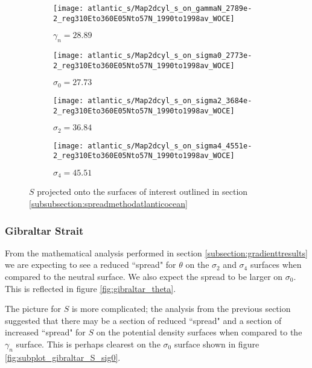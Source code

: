 \begin{figure}[htbp]
    \centering
     \begin{subfigure}[b]{0.4\textwidth}
         \centering
         \texttt{[image: atlantic\_s/Map2dcyl\_s\_on\_gammaN\_2789e-2\_reg310Eto360E05Nto57N\_1990to1998av\_WOCE]}
         \caption{$\gamma_n = 28.89$}
         \label{fig:subplot_atlantic_S_gammaN}
     \end{subfigure}
     \hfill
     \begin{subfigure}[b]{0.4\textwidth}
         \centering
         \texttt{[image: atlantic\_s/Map2dcyl\_s\_on\_sigma0\_2773e-2\_reg310Eto360E05Nto57N\_1990to1998av\_WOCE]}
         \caption{$\sigma_0 = 27.73$}
         \label{fig:subplot_atlantic_S_sig0}
     \end{subfigure}
    \begin{subfigure}[b]{0.4\textwidth}
         \centering
         \texttt{[image: atlantic\_s/Map2dcyl\_s\_on\_sigma2\_3684e-2\_reg310Eto360E05Nto57N\_1990to1998av\_WOCE]}
         \caption{$\sigma_2 = 36.84$}
         \label{fig:subplot_atlantic_S_sig2}
     \end{subfigure}
     \hfill
     \begin{subfigure}[b]{0.4\textwidth}
         \centering
         \texttt{[image: atlantic\_s/Map2dcyl\_s\_on\_sigma4\_4551e-2\_reg310Eto360E05Nto57N\_1990to1998av\_WOCE]}
         \caption{$\sigma_4 = 45.51$}
         \label{fig:subplot_atlantic_S_sig4}
     \end{subfigure}
    \caption{$S$ projected onto the surfaces of interest outlined in section \ref{subsubsection:spreadmethodatlanticocean}}
    \label{fig:atlantic_S}
\end{figure}

\subsubsection{Gibraltar Strait}
\label{subsubsection:spreadresultsgibraltar}

From the mathematical analysis performed in section \ref{subsection:gradienttresults} we are expecting to see a reduced ``spread" for $\theta$ on the $\sigma_2$ and $\sigma_4$ surfaces when compared to the neutral surface. We also expect the spread to be larger on $\sigma_0$. This is reflected in figure \ref{fig:gibraltar_theta}.

The picture for $S$ is more complicated; the analysis from the previous section suggested that there may be a section of reduced ``spread" and a section of increased ``spread" for $S$ on the potential density surfaces when compared to the $\gamma_n$ surface. This is perhaps clearest on the $\sigma_0$ surface shown in figure \ref{fig:subplot_gibraltar_S_sig0}. 

